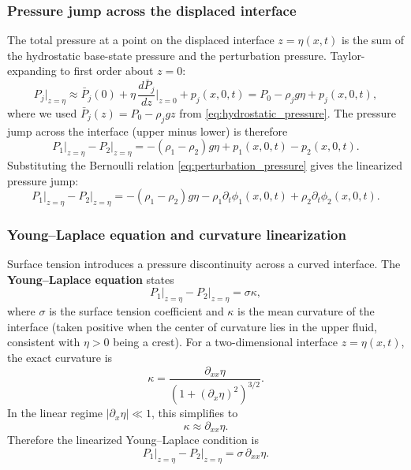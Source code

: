 \documentclass[11pt,a4paper]{article}
\begin{document}
\subsubsection{Pressure jump across the displaced interface}

The total pressure at a point on the displaced interface $z=\eta(x,t)$ is the sum of the hydrostatic base-state pressure and the perturbation pressure.  Taylor-expanding to first order about $z=0$:
\begin{equation}
    P_j\big|_{z=\eta}
    \approx
    \bar{P}_j(0) + \eta\,\frac{d\bar{P}_j}{dz}\bigg|_{z=0} + p_j(x,0,t)
    =
    P_0 - \rho_j g\eta + p_j(x,0,t),
\end{equation}
where we used $\bar{P}_j(z)=P_0-\rho_j g z$ from \eqref{eq:hydrostatic_pressure}.  The pressure jump across the interface (upper minus lower) is therefore
\begin{equation}
    P_1\big|_{z=\eta} - P_2\big|_{z=\eta}
    =
    -(\rho_1-\rho_2)g\eta
    +
    p_1(x,0,t) - p_2(x,0,t).
\end{equation}
Substituting the Bernoulli relation \eqref{eq:perturbation_pressure} gives the linearized pressure jump:
\begin{equation}
    P_1\big|_{z=\eta} - P_2\big|_{z=\eta}
    =
    -(\rho_1-\rho_2)g\eta
    -\rho_1\partial_t\phi_1(x,0,t)
    +\rho_2\partial_t\phi_2(x,0,t).
    \label{eq:linear_pressure_jump}
\end{equation}

\subsubsection{Young--Laplace equation and curvature linearization}

Surface tension introduces a pressure discontinuity across a curved interface.  The \textbf{Young--Laplace equation} states
\begin{equation}
    P_1\big|_{z=\eta} - P_2\big|_{z=\eta}
    =
    \sigma\kappa,
    \label{eq:young_laplace}
\end{equation}
where $\sigma$ is the surface tension coefficient and $\kappa$ is the mean curvature of the interface (taken positive when the center of curvature lies in the upper fluid, consistent with $\eta>0$ being a crest).  For a two-dimensional interface $z=\eta(x,t)$, the exact curvature is
\begin{equation}
    \kappa
    =
    \frac{\partial_{xx}\eta}{\left(1+(\partial_x\eta)^2\right)^{3/2}}.
\end{equation}
In the linear regime $|\partial_x\eta|\ll 1$, this simplifies to
\begin{equation}
    \kappa \approx \partial_{xx}\eta.
    \label{eq:linearized_curvature}
\end{equation}
Therefore the linearized Young--Laplace condition is
\begin{equation}
    P_1\big|_{z=\eta} - P_2\big|_{z=\eta}
    =
    \sigma\,\partial_{xx}\eta.
    \label{eq:linearized_young_laplace}
\end{equation}
\end{document}

